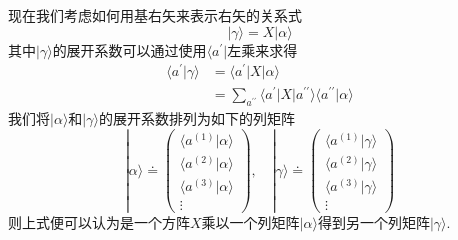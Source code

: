 \documentclass[lang=cn,newtx,10pt,scheme=chinese,thmcnt=section]{elegantbook}
\begin{document}
现在我们考虑如何用基右矢来表示右矢的关系式
\begin{equation}
	|\gamma\rangle=X|\alpha\rangle 
\end{equation}
其中$|\gamma\rangle$的展开系数可以通过使用$\langle a^{'}|$左乘来求得
\begin{equation}
	\begin{aligned}\langle a^{\prime}|\gamma\rangle&=\langle a^{\prime}| X|\alpha\rangle\\&=\sum_{a^{\prime\prime}}\langle a^{\prime}| X| a^{\prime\prime}\rangle\langle a^{\prime\prime}|\alpha\rangle\end{aligned}
\end{equation}
我们将$|\alpha\rangle$和$|\gamma\rangle$的展开系数排列为如下的列矩阵
\begin{equation}
	|\alpha\rangle\doteq\begin{pmatrix}\langle a^{(1)}|\alpha\rangle\\\langle a^{(2)}|\alpha\rangle\\\langle a^{(3)}|\alpha\rangle\\\vdots\end{pmatrix},\quad|\gamma\rangle\doteq
	\begin{pmatrix}\langle a^{(1)}|\gamma\rangle\\\langle a^{(2)}|\gamma\rangle\\\langle a^{(3)}|\gamma\rangle\\\vdots\end{pmatrix}
\end{equation}
则上式便可以认为是一个方阵$X$乘以一个列矩阵$|\alpha\rangle$得到另一个列矩阵$|\gamma\rangle$.
\end{document}
